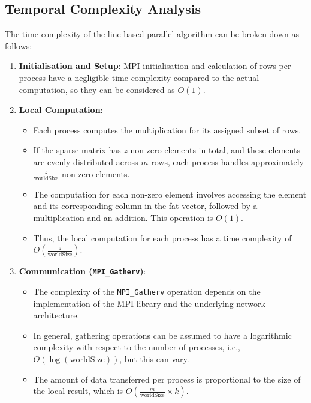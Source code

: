 \documentclass[12pt,oneside]{book} %
\begin{document}
\subsection{Temporal Complexity Analysis}
The time complexity of the line-based parallel algorithm can be broken down as
follows:

\begin{enumerate}
    \item \textbf{Initialisation and Setup}:
          MPI initialisation and calculation of rows per process have a negligible time
          complexity compared to the actual computation, so they can be considered as \(
          O(1) \).

    \item \textbf{Local Computation}:
          \begin{itemize}
              \item Each process computes the multiplication for its assigned subset of rows.
              \item If the sparse matrix has \( z \) non-zero elements in total, and these elements
                    are evenly distributed across \( m \) rows, each process handles approximately
                    \( \frac{z}{\text{worldSize}} \) non-zero elements.
              \item The computation for each non-zero element involves accessing the element and
                    its corresponding column in the fat vector, followed by a multiplication and an
                    addition. This operation is \( O(1) \).
              \item Thus, the local computation for each process has a time complexity of \(
                    O\left(\frac{z}{\text{worldSize}}\right) \).
          \end{itemize}

    \item \textbf{Communication (\texttt{MPI\_Gatherv})}:
          \begin{itemize}
              \item The complexity of the \texttt{MPI\_Gatherv} operation depends on the
                    implementation of the MPI library and the underlying network architecture.
              \item In general, gathering operations can be assumed to have a logarithmic
                    complexity with respect to the number of processes, i.e., \(
                    O(\log(\text{worldSize})) \), but this can vary.
              \item The amount of data transferred per process is proportional to the size of the
                    local result, which is \( O\left(\frac{m}{\text{worldSize}} \times k\right) \).
          \end{itemize}


\end{enumerate}
\end{document}
